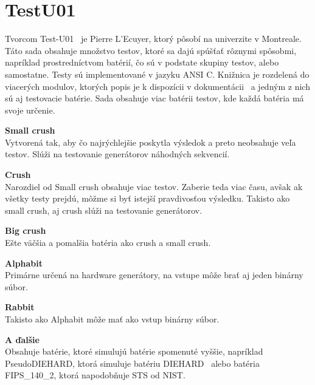 \section{TestU01}
\label{sec:testu01}
Tvorcom Test-U01~\parencite{testu01} je  Pierre L’Ecuyer, ktorý pôsobí na univerzite v Montreale. Táto sada obsahuje množstvo testov, ktoré sa dajú spúšťať rôznymi spôsobmi, napríklad prostredníctvom batérií, čo sú v podstate skupiny testov, alebo samostatne. Testy sú implementované v jazyku ANSI C. Knižnica je rozdelená do viacerých modulov, ktorých popis je k dispozícii v dokumentácii~\parencite{testu01-documentation} a jedným z nich sú aj testovacie batérie. Sada obsahuje viac batérii testov, kde každá batéria má svoje určenie.
\begin{myItemize}
	\item \textbf{Small crush}\\Vytvorená tak, aby čo najrýchlejšie poskytla výsledok a preto neobsahuje veľa testov. Slúži na testovanie generátorov náhodných sekvencií.
	\item \textbf{Crush}\\Narozdiel od Small crush obsahuje viac testov. Zaberie teda viac času, avšak ak všetky testy prejdú, môžme si byť istejší pravdivosťou výsledku. Takisto ako small crush, aj crush slúži na testovanie generátorov.
	\item \textbf{Big crush}\\Ešte väčšia a pomalšia batéria ako crush a small crush. 
	\item \textbf{Alphabit}\\Primárne určená na hardware generátory, na vstupe môže brať aj jeden binárny súbor.
	\item \textbf{Rabbit}\\Takisto ako Alphabit môže mať ako vstup binárny súbor.
	\item \textbf{A ďalšie}\\Obsahuje batérie, ktoré simulujú batérie spomenuté vyššie, napríklad PseudoDIEHARD, ktorá simuluje batériu DIEHARD~\parencite{diehard} alebo batéria FIPS\_140\_2, ktorá napodobňuje STS od NIST.	 
\end{myItemize}
